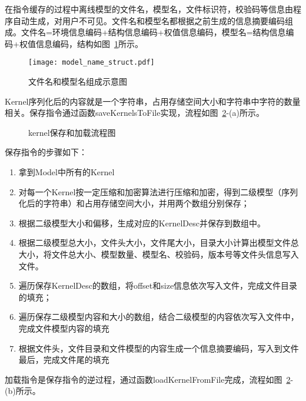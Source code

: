在指令缓存的过程中离线模型的文件名，模型名，文件标识符，校验码等信息由程序自动生成，对用户不可见。文件名和模型名都根据之前生成的信息摘要编码组成。文件名=环境信息编码+结构信息编码+权值信息编码，模型名=结构信息编码+权值信息编码，结构如图~\ref{fig:model-name-struct}所示。


\begin{figure}[htb]
  \centering
  \texttt{[image: model\_name\_struct.pdf]}
  \caption{文件名和模型名组成示意图}
  \label{fig:model-name-struct}
\end{figure}

Kernel序列化后的内容就是一个字符串，占用存储空间大小和字符串中字符的数量相关。保存指令通过函数saveKernelsToFile实现，流程如图~\ref{fig:kernel-process}-(a)所示。

\begin{figure}[htb]
  \centering
  \caption{kernel保存和加载流程图}
  \label{fig:kernel-process}
\end{figure}

保存指令的步骤如下：
\begin{enumerate}
  \item 拿到Model中所有的Kernel
  \item 对每一个Kernel按一定压缩和加密算法进行压缩和加密，得到二级模型（序列化后的字符串）和占用存储空间大小，并用两个数组分别保存；
  \item 根据二级模型大小和偏移，生成对应的KernelDesc并保存到数组中。
  \item 根据二级模型总大小，文件头大小，文件尾大小，目录大小计算出模型文件总大小，将文件总大小、模型数量、模型名、校验码，版本号等文件头信息写入文件。
  \item 遍历保存KernelDesc的数组，将offset和size信息依次写入文件，完成文件目录的填充；
  \item 遍历保存二级模型内容和大小的数组，结合二级模型的内容依次写入文件中，完成文件模型内容的填充
  \item 根据文件头，文件目录和文件模型的内容生成一个信息摘要编码，写入到文件最后，完成文件尾的填充
\end{enumerate}
加载指令是保存指令的逆过程，通过函数loadKernelFromFile完成，流程如图~\ref{fig:kernel-process}-(b)所示。

